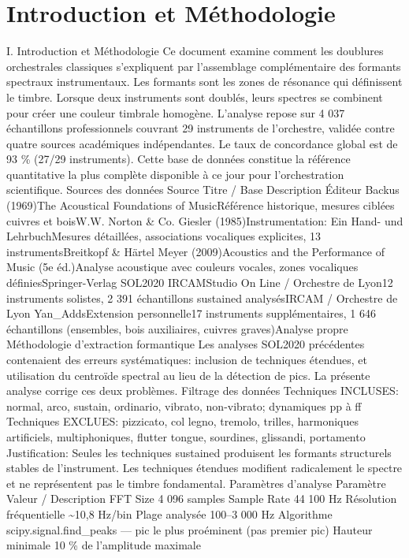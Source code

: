 \documentclass[11pt,a4paper]{article}
\begin{document}
\section{Introduction et Méthodologie}
I. Introduction et Méthodologie Ce document examine comment les doublures orchestrales classiques s'expliquent par l'assemblage complémentaire des formants spectraux instrumentaux. Les formants sont les zones de résonance qui définissent le timbre. Lorsque deux instruments sont doublés, leurs spectres se combinent pour créer une couleur timbrale homogène. L'analyse repose sur 4 037 échantillons professionnels couvrant 29 instruments de l'orchestre, validée contre quatre sources académiques indépendantes. Le taux de concordance global est de 93 \% (27/29 instruments). Cette base de données constitue la référence quantitative la plus complète disponible à ce jour pour l'orchestration scientifique. Sources des données Source Titre / Base Description Éditeur Backus (1969)The Acoustical Foundations of MusicRéférence historique, mesures ciblées cuivres et boisW.W. Norton \& Co. Giesler (1985)Instrumentation: Ein Hand- und LehrbuchMesures détaillées, associations vocaliques explicites, 13 instrumentsBreitkopf \& Härtel Meyer (2009)Acoustics and the Performance of Music (5e éd.)Analyse acoustique avec couleurs vocales, zones vocaliques définiesSpringer-Verlag SOL2020 IRCAMStudio On Line / Orchestre de Lyon12 instruments solistes, 2 391 échantillons sustained analysésIRCAM / Orchestre de Lyon Yan\_AddsExtension personnelle17 instruments supplémentaires, 1 646 échantillons (ensembles, bois auxiliaires, cuivres graves)Analyse propre Méthodologie d'extraction formantique Les analyses SOL2020 précédentes contenaient des erreurs systématiques: inclusion de techniques étendues, et utilisation du centroïde spectral au lieu de la détection de pics. La présente analyse corrige ces deux problèmes. Filtrage des données Techniques INCLUSES: normal, arco, sustain, ordinario, vibrato, non-vibrato; dynamiques pp à ff Techniques EXCLUES: pizzicato, col legno, tremolo, trilles, harmoniques artificiels, multiphoniques, flutter tongue, sourdines, glissandi, portamento Justification: Seules les techniques sustained produisent les formants structurels stables de l'instrument. Les techniques étendues modifient radicalement le spectre et ne représentent pas le timbre fondamental. Paramètres d'analyse Paramètre Valeur / Description FFT Size 4 096 samples Sample Rate 44 100 Hz Résolution fréquentielle \textasciitilde{}10,8 Hz/bin Plage analysée 100–3 000 Hz Algorithme scipy.signal.find\_peaks — pic le plus proéminent (pas premier pic) Hauteur minimale 10 \% de l'amplitude maximale
\par\medskip
\end{document}
